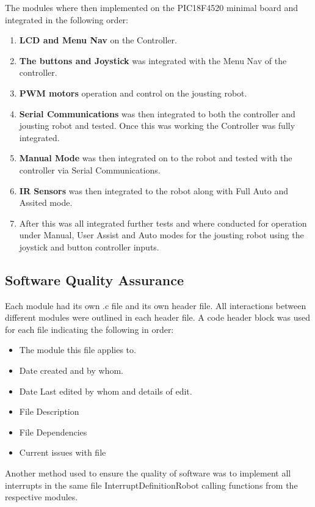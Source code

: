\documentclass{article}
\begin{document}
The modules where then implemented on the PIC18F4520 minimal board and integrated in the following order:
	\begin{enumerate}
		\item \textbf{LCD and Menu Nav} on the Controller.
		\item \textbf{The buttons and Joystick} was integrated with the Menu Nav of the controller.
		\item \textbf{PWM motors} operation and control on the jousting robot.
		\item \textbf{Serial Communications} was then integrated to both the controller and jousting robot and tested. Once this was working the Controller was fully integrated.
		\item \textbf{Manual Mode} was then integrated on to the robot and tested with the controller via Serial Communications. 
		\item \textbf{IR Sensors} was then integrated to the robot along with Full Auto and Assited mode.
		\item After this was all integrated further tests and where conducted for operation under Manual, User Assist and Auto modes for the jousting robot using the joystick and button controller inputs.	
	\end{enumerate}

\subsection{Software Quality Assurance}
Each module had its own .c file and its own header file. All interactions between different modules were outlined in each header file.
A code header block was used for each file indicating the following in order:

	\begin{itemize}
		\item The module this file applies to.
		\item Date created and by whom.
		\item Date Last edited by whom and details of edit.
		\item File Description
		\item File Dependencies
		\item Current issues with file
	\end{itemize}
	
Another method used to ensure the quality of software was to implement all interrupts in the same file Interrupt\textunderscore Definition\textunderscore Robot calling functions from the respective modules. 
\end{document}
